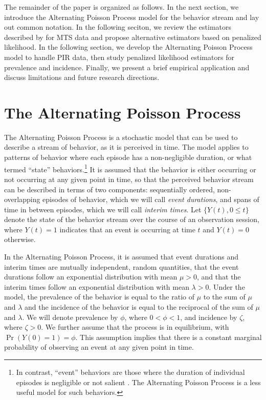\documentclass[man, noextraspace, floatsintext]{apa6}\usepackage[]{graphicx}\usepackage[]{color}
\begin{document}

The remainder of the paper is organized as follows. In the next section, we introduce the Alternating Poisson Process model for the behavior stream and lay out common notation. In the following seciton, we review the estimators described by \citet{Brown1977estimation} for MTS data and propose alternative estimators based on penalized likelihood. In the following section, we develop the Alternating Poisson Process model to handle PIR data, then study penalized likelihood estimators for prevalence and incidence. Finally, we present a brief empirical application and discuss limitations and future research directions.

\section{The Alternating Poisson Process}
\label{sec:APP}

The Alternating Poisson Process is a stochastic model that can be used to describe a stream of behavior, as it is perceived in time. The model applies to patterns of behavior where each episode has a non-negligible duration, or what \citet{Altmann1974observational} termed ``state'' behaviors.\footnote{In contrast, ``event'' behaviors are those where the duration of individual episodes is negligible or not salient \citep{Altmann1974observational}. The Alternating Poisson Process is a less useful model for such behaviors.} It is assumed that the behavior is either occurring or not occurring at any given point in time, so that the perceived behavior stream can be described in terms of two components: sequentially ordered, non-overlapping episodes of behavior, which we will call \textit{event durations}, and spans of time in between episodes, which we will call \textit{interim times}. Let $\{Y(t), 0 \leq t\}$ denote the state of the behavior stream over the course of an observation session, where $Y(t) = 1$ indicates that an event is occurring at time $t$ and $Y(t) = 0$ otherwise.

In the Alternating Poisson Process, it is assumed that event durations and interim times are mutually independent, random quantities, that the event durations follow an exponential distribution with mean $\mu > 0$, and that the interim times follow an exponential distribution with mean $\lambda > 0$.  Under the model, the prevalence of the behavior is equal to the ratio of $\mu$ to the sum of $\mu$ and $\lambda$ and the incidence of the behavior is equal to the reciprocal of the sum of $\mu$ and $\lambda$. We will denote prevalence by $\phi$, where $0 < \phi < 1$, and incidence by $\zeta$, where $\zeta > 0$. We further assume that the process is in equilibrium, with $\Pr\left(Y(0) = 1\right) = \phi$. This assumption implies that there is a constant marginal probability of observing an event at any given point in time.
\end{document}
